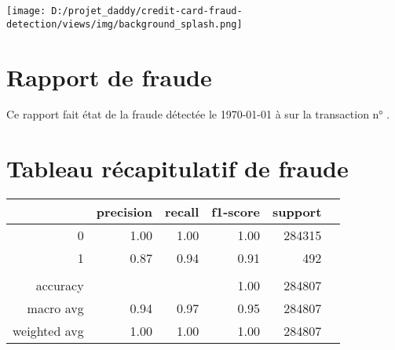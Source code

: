 \documentclass[10pt,a4paper]{article}
\newcommand{\dice}{\rand\arabic{rand}}
\begin{document}
\begin{center}
\texttt{[image: D:/projet\_daddy/credit-card-fraud-detection/views/img/background\_splash.png]} 
\end{center}
\section{Rapport de fraude}
\flushleft
\bigbreak  
\bigbreak  
Ce rapport fait état de la fraude détectée   le \today{}  à  \DTMcurrenttime{} sur la transaction n°\dice \dice {}  .
\bigbreak  
\bigbreak  
\bigbreak  
\bigbreak  
\bigbreak  
\bigbreak  
\bigbreak  
\section{Tableau récapitulatif de fraude}
\flushleft
\bigbreak  
\bigbreak  
\begin{center}
\begin{tabular}{| r | r | r | r | r | r | }
\hline
 & precision & recall & f1-score & support\\
\hline
0 & 1.00 & 1.00 & 1.00 & 284315 \\
\hline
1 & 0.87 & 0.94 & 0.91 & 492\\
\hline
& & & &\\
\hline
accuracy &  & & 1.00 & 284807\\
\hline
macro avg & 0.94 & 0.97 & 0.95 & 284807\\
\hline
weighted avg & 1.00 & 1.00 & 1.00 & 284807\\
\hline

\end{tabular}
\end{center}
\end{document}
